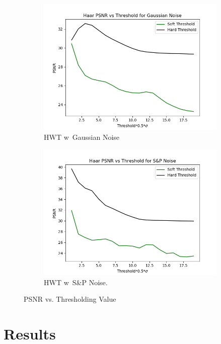 \documentclass{article}
\begin{document}
\begin{figure}[h!]
\begin{subfigure}[b]{0.45\linewidth}
		\includegraphics[width=\linewidth]{../../1_Resources/images/HWT_threshold_g.png}
		\caption{HWT w\ Gaussian Noise}
	\end{subfigure}
	\begin{subfigure}[b]{0.45\linewidth}
		\includegraphics[width=\linewidth]{../../1_Resources/images/HWT_threshold_sp.png}
		\caption{HWT w\ S\&P Noise.}
	\end{subfigure}	
	\caption{PSNR vs. Thresholding Value}
	\label{fig:psnr_threshold}
\end{figure}


\section{Results}
\centering
{}
\end{document}

